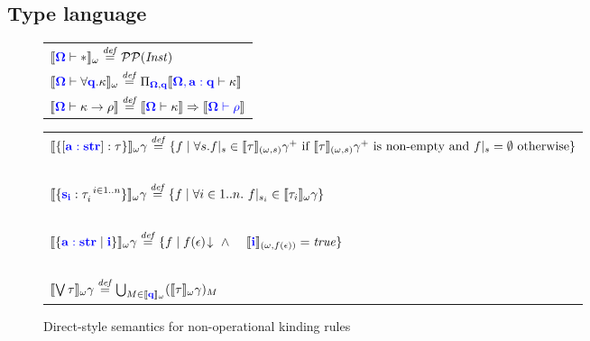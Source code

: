 \documentclass[sigplan,10pt,review,anonymous]{acmart}
\newcommand{\blum}[1]{\mathbf{\color{blue}{#1}}}
\newcommand{\defeq}{\overset{\mathit{def}}{=}}
\newcommand{\sem}[1]{\llbracket #1 \rrbracket}
\begin{document}
\subsection{Type language}


\begin{figure}
\begin{tabular}{l}
$\sem{\blum{\Omega} \vdash \ast}_\omega \defeq \mathcal P \mathcal P (\mathit{Inst})$\\
$\sem{\blum{\Omega} \vdash \forall \blum{q}. \kappa}_\omega \defeq \Pi_{\blum{\Omega},\blum{q}} \sem{\blum{\Omega, a : q} \vdash \kappa}$\\
$\sem{\blum{\Omega} \vdash \kappa \to \rho} \defeq \sem{\blum{\Omega} \vdash \kappa} \Rightarrow \sem{\blum{\Omega \vdash \rho}}$
\end{tabular}
\end{figure}

\begin{figure*}
\begin{tabular}{l}
$\sem{\{ [\blum{a : str}] : \tau \}}_\omega \gamma \defeq \{ f \mid \forall s. f |_s \in \sem{\tau}_{(\omega,s)} \gamma^+ \text{ if } \sem{\tau}_{(\omega,s)} \gamma^+ \text{ is non-empty } \text{and } f |_s = \emptyset \text{ otherwise} \}$ \\~\\
$\sem{\{ \blum{s_i} : \tau_i^{~i \in 1..n}\}}_\omega \gamma \defeq \{ f \mid \forall i \in 1..n.~f |_{s_i} \in \sem{\tau_i}_{\omega} \gamma \}$\\~\\
$\sem{\{ \blum{a : str} \mid \blum{i} \}}_\omega \gamma \defeq \{ f \mid f(\epsilon) \! \downarrow~\wedge~~~~\sem{\blum{i}}_{(\omega, f(\epsilon))} = \mathit{true} \}$\\~\\
$\sem{\bigvee \tau}_{\omega} \gamma \defeq \bigcup_{M \in \sem{\blum{q}}_\omega} (\sem{\tau}_{\omega} \gamma)_M$
\end{tabular}

\caption{Direct-style semantics for non-operational kinding rules}
\label{fig:kindsem-direct}
\end{figure*}
\end{document}
